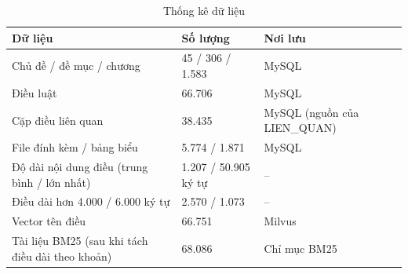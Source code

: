 \begin{table}[H]
\centering
\small
\caption{Thống kê dữ liệu}
\label{tab:dulieu}
\begin{tabular}{|L{6.6cm}|L{3.4cm}|L{3.6cm}|}
\hline
\textbf{Dữ liệu} & \textbf{Số lượng} & \textbf{Nơi lưu} \\ \hline
Chủ đề / đề mục / chương & 45 / 306 / 1.583 & MySQL \\ \hline
Điều luật & 66.706 & MySQL \\ \hline
Cặp điều liên quan & 38.435 & MySQL (nguồn của LIEN\_QUAN) \\ \hline
File đính kèm / bảng biểu & 5.774 / 1.871 & MySQL \\ \hline
Độ dài nội dung điều (trung bình / lớn nhất) & 1.207 / 50.905 ký tự & -- \\ \hline
Điều dài hơn 4.000 / 6.000 ký tự & 2.570 / 1.073 & -- \\ \hline
Vector tên điều & 66.751 & Milvus \\ \hline
Tài liệu BM25 (sau khi tách điều dài theo khoản) & 68.086 & Chỉ mục BM25 \\ \hline
\end{tabular}
\end{table}
